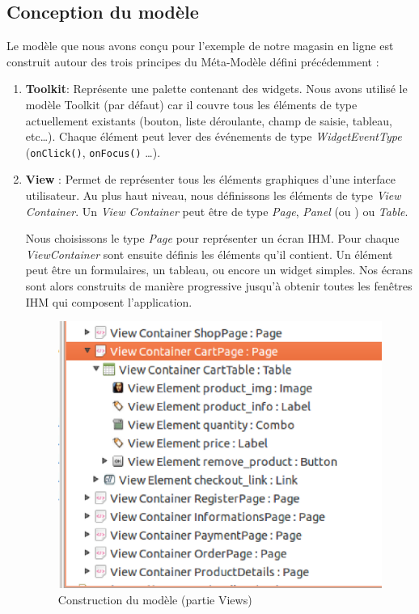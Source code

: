 \subsection{Conception du modèle}
Le modèle que nous avons conçu pour l'exemple de notre magasin en ligne est construit autour des trois principes du Méta-Modèle défini précédemment :
\begin{enumerate}
\item \textbf{Toolkit}: Représente une palette contenant des widgets. Nous avons utilisé le modèle Toolkit (par défaut) car il couvre tous les éléments de type   actuellement existants (bouton, liste déroulante, champ de saisie, tableau, etc\dots). Chaque élément  peut lever des événements de type \textit{WidgetEventType} (\verb+onClick()+, \verb+onFocus()+ \dots). 

\item \textbf{View} : Permet de représenter tous les éléments graphiques d'une interface utilisateur. Au plus haut niveau, nous définissons les éléments de type \textit{View Container}. Un \textit{View Container} peut être de type \textit{Page}, \textit{Panel} (ou ) ou \textit{Table}. 

Nous choisissons le type \textit{Page} pour représenter un écran \textsc{IHM}. Pour chaque \textit{ViewContainer} sont ensuite définis les éléments qu'il contient. Un élément peut être un formulaires, un tableau, ou encore un widget simples. Nos écrans sont alors construits de manière progressive jusqu'à obtenir toutes les fenêtres \textsc{IHM} qui composent l'application.
\begin{figure}[H]
  \centering
  \includegraphics[scale=.4]{img/views.eps}
  \caption{Construction du modèle (partie Views)}
  \label{fig:view}
\end{figure}


\end{enumerate}
